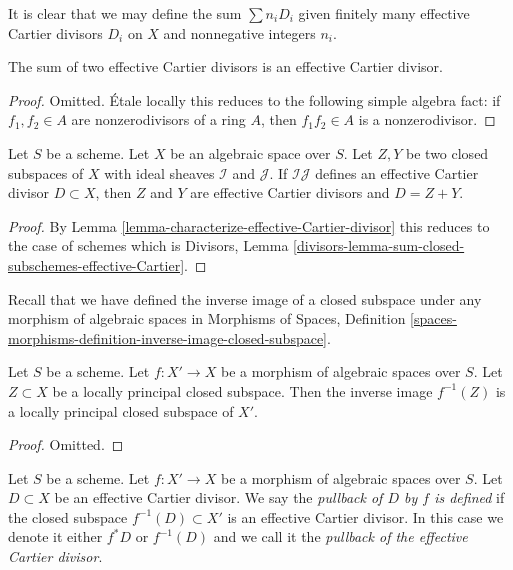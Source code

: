 \noindent
It is clear that we may define the sum $\sum n_iD_i$ given
finitely many effective Cartier divisors $D_i$ on $X$
and nonnegative integers $n_i$.

\begin{lemma}
\label{lemma-sum-effective-Cartier-divisors}
The sum of two effective Cartier divisors is an effective
Cartier divisor.
\end{lemma}

\begin{proof}
Omitted. \'Etale locally this reduces to the following simple
algebra fact: if $f_1, f_2 \in A$ are nonzerodivisors of a ring $A$, then
$f_1f_2 \in A$ is a nonzerodivisor.
\end{proof}

\begin{lemma}
\label{lemma-sum-closed-subschemes-effective-Cartier}
Let $S$ be a scheme. Let $X$ be an algebraic space over $S$.
Let $Z, Y$ be two closed subspaces of $X$
with ideal sheaves $\mathcal{I}$ and $\mathcal{J}$. If $\mathcal{I}\mathcal{J}$
defines an effective Cartier divisor $D \subset X$, then $Z$ and $Y$
are effective Cartier divisors and $D = Z + Y$.
\end{lemma}

\begin{proof}
By Lemma \ref{lemma-characterize-effective-Cartier-divisor}
this reduces to the case of schemes which is
Divisors, Lemma \ref{divisors-lemma-sum-closed-subschemes-effective-Cartier}.
\end{proof}

\noindent
Recall that we have defined the inverse image of a closed subspace
under any morphism of algebraic spaces in
Morphisms of Spaces, Definition
\ref{spaces-morphisms-definition-inverse-image-closed-subspace}.

\begin{lemma}
\label{lemma-pullback-locally-principal}
Let $S$ be a scheme.
Let $f : X' \to X$ be a morphism of algebraic spaces over $S$.
Let $Z \subset X$ be a locally principal closed subspace.
Then the inverse image $f^{-1}(Z)$ is a locally principal closed
subspace of $X'$.
\end{lemma}

\begin{proof}
Omitted.
\end{proof}

\begin{definition}
\label{definition-pullback-effective-Cartier-divisor}
Let $S$ be a scheme.
Let $f : X' \to X$ be a morphism of algebraic spaces over $S$.
Let $D \subset X$
be an effective Cartier divisor. We say the {\it pullback of
$D$ by $f$ is defined} if the closed subspace $f^{-1}(D) \subset X'$
is an effective Cartier divisor. In this case we denote it either
$f^*D$ or $f^{-1}(D)$ and we call it the
{\it pullback of the effective Cartier divisor}.
\end{definition}

